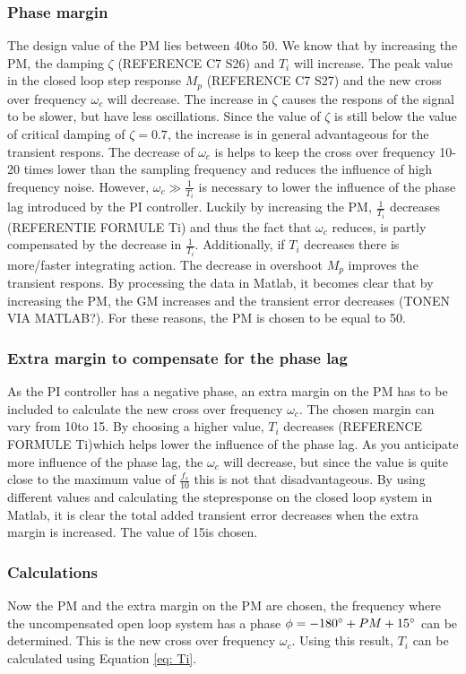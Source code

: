 \documentclass[a4paper,kul]{kulakarticle} %
\begin{document}
\subsubsection{Phase margin}
The design value of the PM lies between 40\degree to 50\degree. We know that by increasing the PM, the damping $\zeta$ (REFERENCE C7 S26) and $T_i$ will increase. The peak value in the closed loop step response $M_p$ (REFERENCE C7 S27) and the new cross over frequency $\omega_c$ will decrease. The increase in $\zeta$ causes the respons of the signal to be slower, but have less oscillations. Since the value of $\zeta$ is still below the value of critical damping of $\zeta = 0.7$, the increase is in general advantageous for the transient respons. The decrease of $\omega_c$ is helps to keep the cross over frequency 10-20 times lower than the sampling frequency and reduces the influence of high frequency noise. However, $\omega_c \gg \frac{1}{T_i}$ is necessary to lower the influence of the phase lag introduced by the PI controller. Luckily by increasing the PM, $\frac{1}{T_i}$ decreases (REFERENTIE FORMULE Ti) and thus the fact that $\omega_c$ reduces, is partly compensated by the decrease in $\frac{1}{T_i}$. Additionally, if $T_i$ decreases there is more/faster integrating action. The decrease in overshoot $M_p$ improves the transient respons. By processing the data in Matlab, it becomes clear that by increasing the PM, the GM increases and the transient error decreases (TONEN VIA MATLAB?). For these reasons, the PM is chosen to be equal to 50\degree. 

\subsubsection{Extra margin to compensate for the phase lag}
As the PI controller has a negative phase, an extra margin on the PM has to be included to calculate the new cross over frequency $\omega_c$. The chosen margin can vary from 10\degree to 15\degree. By choosing a higher value, $T_i$ decreases (REFERENCE FORMULE Ti)which helps lower the influence of the phase lag. As you anticipate more influence of the phase lag, the $\omega_c$ will decrease, but since the value is quite close to the maximum value of $\frac{f_s}{10}$ this is not that disadvantageous. By using different values and calculating the stepresponse on the closed loop system in Matlab, it is clear the total added transient error decreases when the extra margin is increased. The value of 15\degree is chosen. 

\subsubsection{Calculations}
Now the PM and the extra margin on the PM are chosen, the frequency where the uncompensated open loop system has a phase $\phi = -180\degree + PM + 15\degree$ can be determined. This is the new cross over frequency $\omega_c$. Using this result, $T_i$ can be calculated using Equation \ref{eq: Ti}. 
\end{document}
